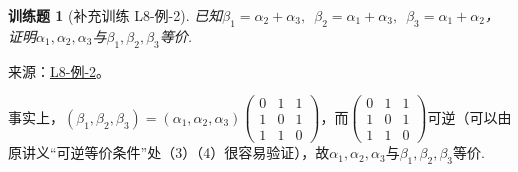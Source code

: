 \documentclass[UTF8,12pt,a4paper,fontset=fandol]{ctexart}
\newtheorem{exercise}{训练题}[section]
\begin{document}
\begin{exercise}[补充训练 L8-例-2]\label{prob:L8-例-2}
已知$\beta_1=\alpha_2+\alpha_3,\enspace\beta_2=\alpha_1+\alpha_3,\enspace\beta_3=\alpha_1+\alpha_2$，证明$\alpha_1,\alpha_2,\alpha_3$与$\beta_1,\beta_2,\beta_3$等价.
\end{exercise}
\noindent 来源：\href{https://github.com/yhwu-is/Linear-Algebra-Left-Undone/blob/new/%E8%AE%B2%E4%B9%89/%E4%B8%93%E9%A2%98/8%20%E7%9B%B8%E6%8A%B5%E6%A0%87%E5%87%86%E5%BD%A2.tex}{L8-例-2}。
\begin{solve}
事实上，$(\beta_1,\beta_2,\beta_3)=(\alpha_1,\alpha_2,\alpha_3)\begin{pmatrix}
            0 & 1 & 1 \\
            1 & 0 & 1 \\
            1 & 1 & 0
        \end{pmatrix}$，而$\begin{pmatrix}
            0 & 1 & 1 \\
            1 & 0 & 1 \\
            1 & 1 & 0
        \end{pmatrix}$可逆（可以由原讲义“可逆等价条件”处（3）（4）很容易验证），故$\alpha_1,\alpha_2,\alpha_3$与$\beta_1,\beta_2,\beta_3$等价.
\end{solve}
\end{document}

